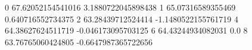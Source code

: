 0 67.62052154541016 3.1880722045898438
1 65.07316589355469 0.640716552734375
2 63.28439712524414 -1.1480522155761719
4 64.38627624511719 -0.046173095703125
6 64.43244934082031 0.0
8 63.76765060424805 -0.6647987365722656
